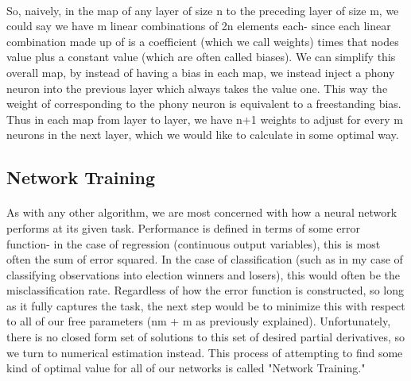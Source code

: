 \documentclass[11pt]{scrartcl} %
\begin{document}
\paragraph{}
So, naively, in the map of any layer of size n to the preceding layer of size m, we could say we have m linear combinations of 2n elements each- since each linear combination made up of is a coefficient (which we call weights) times that nodes value plus a constant value (which are often called biases). We can simplify this overall map, by instead of having a bias in each map, we instead inject a phony neuron into the previous layer which always takes the value one. This way the weight of corresponding to the phony neuron is equivalent to a freestanding bias. Thus in each map from layer to layer, we have n+1 weights to adjust for every m neurons in the next layer, which we would like to calculate in some optimal way.


\subsection{Network Training}
\paragraph{}
As with any other algorithm, we are most concerned with how a neural network performs at its given task. Performance is defined in terms of some error function- in the case of regression (continuous output variables), this is most often the sum of error squared. In the case of classification (such as in my case of classifying observations into election winners and losers), this would often be the misclassification rate. Regardless of how the error function is constructed, so long as it fully captures the task, the next step would be to minimize this with respect to all of our free parameters (nm + m as previously explained). Unfortunately, there is no closed form set of solutions to this set of desired partial derivatives, so we turn to numerical estimation instead. This process of attempting to find some kind of optimal value for all of our networks is called "Network Training."
\end{document}
